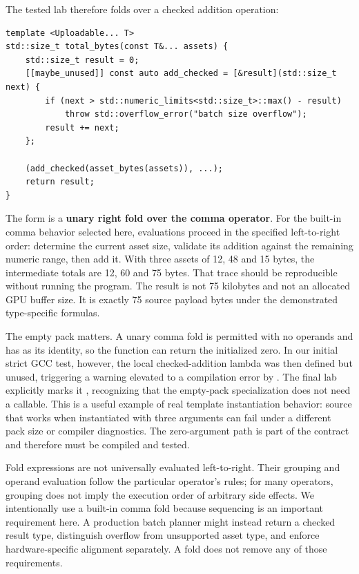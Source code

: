The tested lab therefore folds over a checked addition operation:

\begin{verbatim}
template <Uploadable... T>
std::size_t total_bytes(const T&... assets) {
    std::size_t result = 0;
    [[maybe_unused]] const auto add_checked = [&result](std::size_t next) {
        if (next > std::numeric_limits<std::size_t>::max() - result)
            throw std::overflow_error("batch size overflow");
        result += next;
    };

    (add_checked(asset_bytes(assets)), ...);
    return result;
}
\end{verbatim}

The  form is a \textbf{unary right fold over the comma operator}. For the built-in comma behavior selected here, evaluations proceed in the specified left-to-right order: determine the current asset size, validate its addition against the remaining numeric range, then add it. With three assets of 12, 48 and 15 bytes, the intermediate totals are 12, 60 and 75 bytes. That trace should be reproducible without running the program. The result is not 75 kilobytes and not an allocated GPU buffer size. It is exactly 75 source payload bytes under the demonstrated type-specific formulas.

The empty pack matters. A unary comma fold is permitted with no operands and has  as its identity, so the function can return the initialized zero. In our initial strict GCC test, however, the local checked-addition lambda was then defined but unused, triggering a warning elevated to a compilation error by . The final lab explicitly marks it , recognizing that the empty-pack specialization does not need a callable. This is a useful example of real template instantiation behavior: source that works when instantiated with three arguments can fail under a different pack size or compiler diagnostics. The zero-argument path is part of the contract and therefore must be compiled and tested.

Fold expressions are not universally evaluated left-to-right. Their grouping and operand evaluation follow the particular operator's rules; for many operators, grouping does not imply the execution order of arbitrary side effects. We intentionally use a built-in comma fold because sequencing is an important requirement here. A production batch planner might instead return a checked result type, distinguish overflow from unsupported asset type, and enforce hardware-specific alignment separately. A fold does not remove any of those requirements.

